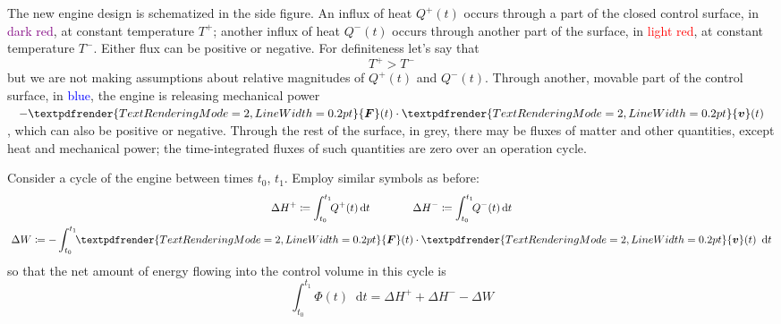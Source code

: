 \documentclass[a4paper,12pt,%
onecolumn,oneside,%
british%
]{memoir}
\renewcommand*{\bm}[1]{\textpdfrender{TextRenderingMode=2,LineWidth=0.2pt}{\boldsymbol{#1}}}
\newcommand*{\di}{\mathop{}\!\mathrm{d}}%
\newcommand*{\incr}{\Delta}%
\newcommand*{\defd}{\coloneqq}
\renewcommand*{\|}[1][]{\nonscript\:#1\vert\nonscript\:\mathopen{}}
\newcommand*{\yv}{\bm{v}}
\newcommand*{\yti}{t_{0}}
\newcommand*{\ytf}{t_{1}}
\newcommand*{\dt}{\di t}
\newcommand*{\yH}{\varPhi}%
\newcommand*{\yQ}{Q}%
\newcommand*{\yQp}{\yQ^{+}}%
\newcommand*{\yQm}{\yQ^{-}}%
\newcommand*{\yhep}{\incr H^{+}}%
\newcommand*{\yhem}{\incr H^{-}}%
\newcommand*{\yW}{\incr W}%
\newcommand*{\yF}{\bm{F}}
\newcommand*{\yT}{T}%
\newcommand*{\yTp}{\yT^{+}}%
\newcommand*{\yTm}{\yT^{-}}%
\begin{document}
The new engine design is schematized in the side figure. An influx of heat $\yQp(t)$ occurs through a part of the closed control surface, in \textcolor{purple}{dark red}, at constant temperature $\yTp$; another influx of heat $\yQm(t)$ occurs through another part of the surface, in \textcolor{red}{light red}, at constant temperature $\yTm$. Either flux can be positive or negative. For definiteness let's say that
\begin{equation*}
  \yTp > \yTm
\end{equation*}
but we are not making assumptions about relative magnitudes of $\yQp(t)$ and $\yQm(t)$. Through another, movable part of the control surface, in \textcolor{blue}{blue}, the engine is releasing mechanical power $-\yF(t)\cdot\yv(t)$, which can also be positive or negative. Through the rest of the surface, in \textcolor{midgrey}{grey}, there may be fluxes of matter and other quantities, except heat and mechanical power; the time-integrated fluxes of such quantities are zero over an operation cycle.
%
%

Consider a cycle of the engine between times $\yti$, $\ytf$. Employ similar symbols as before:
\begin{equation*}
  \begin{gathered}
    \yhep \defd \int_{\yti}^{\ytf}\!\!\yQp(t)\dt
    \qquad\qquad
    \yhem \defd \int_{\yti}^{\ytf}\!\!\yQm(t)\dt
    \\
    \yW \defd -\int_{\yti}^{\ytf}\!\!\yF(t)\cdot\yv(t)\ \dt
  \end{gathered}
\end{equation*}
so that the net amount of energy flowing into the control volume in this cycle is
\begin{equation*}
  \int_{\yti}^{\ytf}\!\!\yH(t)\dt =
 \yhep + \yhem -\yW
\end{equation*}
\end{document}

